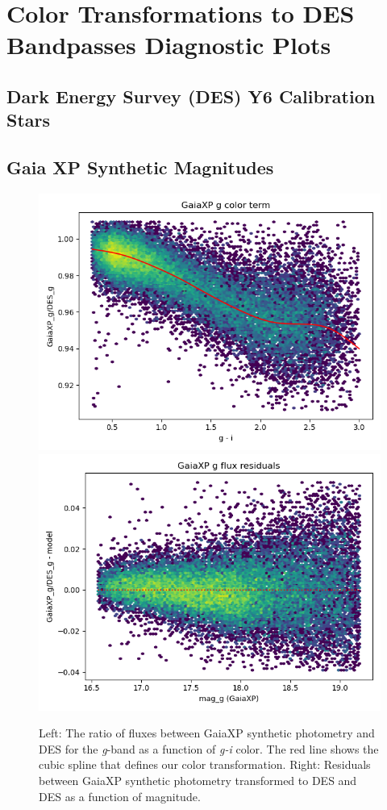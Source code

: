 \section{Color Transformations to DES Bandpasses Diagnostic Plots}
\label{app:colorplots}
\subsection{Dark Energy Survey (DES) Y6 Calibration Stars}

\subsection{Gaia XP Synthetic Magnitudes}
\begin{figure}
    \includegraphics[width=0.49\linewidth]{./figures/color_terms/GaiaXP_to_DES_band_g_color_term.png}
    \includegraphics[width=0.49\linewidth]{./figures/color_terms/GaiaXP_to_DES_band_g_flux_residuals.png}
    \caption{Left: The ratio of fluxes between GaiaXP synthetic photometry and DES for the \textit{g}-band as a function of \textit{g-i} color. The red line shows the cubic spline that defines our color transformation.
    Right: Residuals between GaiaXP synthetic photometry transformed to DES and DES as a function of magnitude.}
    \label{fig:acolor-xp-g}
\end{figure}
